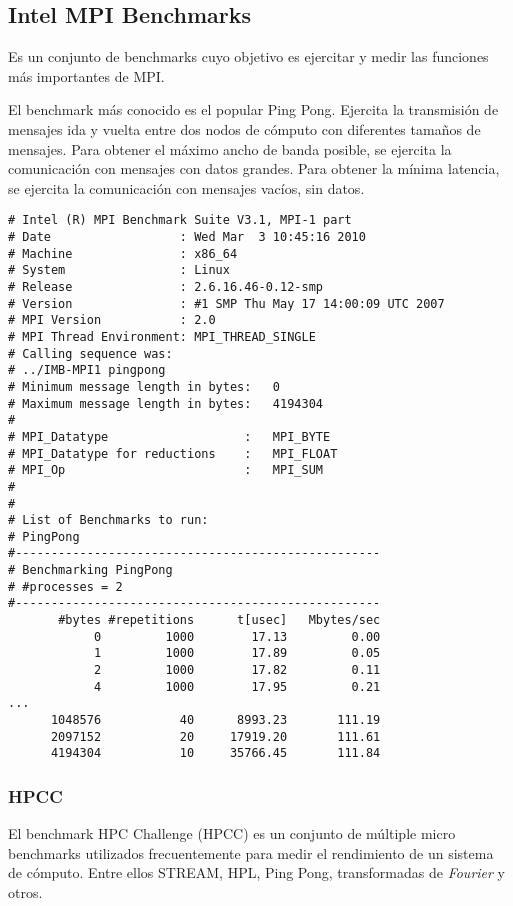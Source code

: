 \documentclass[a4paper]{report}
\begin{document}
\subsection{Intel MPI Benchmarks}

Es un conjunto de benchmarks cuyo objetivo es ejercitar y medir las funciones m\'as importantes de MPI.

El benchmark m\'as conocido es el popular Ping Pong. Ejercita la transmisi\'on de mensajes ida y vuelta entre dos
nodos de c\'omputo con diferentes tama\~nos de mensajes.
Para obtener el m\'aximo ancho de banda posible, se ejercita la comunicaci\'on con mensajes con datos grandes.
Para obtener la m\'inima latencia, se ejercita la comunicaci\'on con mensajes vac\'ios, sin datos.

\begin{verbatim}
# Intel (R) MPI Benchmark Suite V3.1, MPI-1 part
# Date                  : Wed Mar  3 10:45:16 2010
# Machine               : x86_64
# System                : Linux
# Release               : 2.6.16.46-0.12-smp
# Version               : #1 SMP Thu May 17 14:00:09 UTC 2007
# MPI Version           : 2.0
# MPI Thread Environment: MPI_THREAD_SINGLE
# Calling sequence was:
# ../IMB-MPI1 pingpong
# Minimum message length in bytes:   0
# Maximum message length in bytes:   4194304
#
# MPI_Datatype                   :   MPI_BYTE
# MPI_Datatype for reductions    :   MPI_FLOAT
# MPI_Op                         :   MPI_SUM
#
#
# List of Benchmarks to run:
# PingPong
#---------------------------------------------------
# Benchmarking PingPong
# #processes = 2
#---------------------------------------------------
       #bytes #repetitions      t[usec]   Mbytes/sec
            0         1000        17.13         0.00
            1         1000        17.89         0.05
            2         1000        17.82         0.11
            4         1000        17.95         0.21
...
      1048576           40      8993.23       111.19
      2097152           20     17919.20       111.61
      4194304           10     35766.45       111.84
\end{verbatim}

\subsubsection{HPCC}

El benchmark HPC Challenge (HPCC) es un conjunto de m\'ultiple micro benchmarks utilizados frecuentemente para medir
el rendimiento de un sistema de c\'omputo. Entre ellos STREAM, HPL, Ping Pong, transformadas de {\it Fourier} y
otros.
\end{document}
